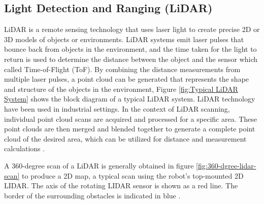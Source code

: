\subsection{Light Detection and Ranging (LiDAR)}
\label{rrl:subsec:Light Detection and Ranging}
LiDAR is a remote sensing technology that uses laser light to create precise 2D or 3D models of objects or environments. LiDAR systems emit laser pulses that bounce back from objects in the environment, and the time taken for the light to return is used to determine the distance between the object and the sensor which called Time-of-Flight (ToF). By combining the distance measurements from multiple laser pulses, a point cloud can be generated that represents the shape and structure of the objects in the environment, Figure \ref{fig:Typical LiDAR System} shows the block diagram of a typical LiDAR system. LiDAR technology have been used in industrial settings. In the context of LiDAR scanning, individual point cloud scans are acquired and processed for a specific area. These point clouds are then merged and blended together to generate a complete point cloud of the desired area, which can be utilized for distance and measurement calculations \citep{jaboyedoff2012, raj2020}.

A 360-degree scan of a LiDAR is generally obtained in figure \ref{fig:360-dgree-lidar-scan} to produce a 2D map, a typical scan using the robot's top-mounted 2D LIDAR. The axis of the rotating LIDAR sensor is shown as a red line. The border of the surrounding obstacles is indicated in blue \citep{sarker2020}.

